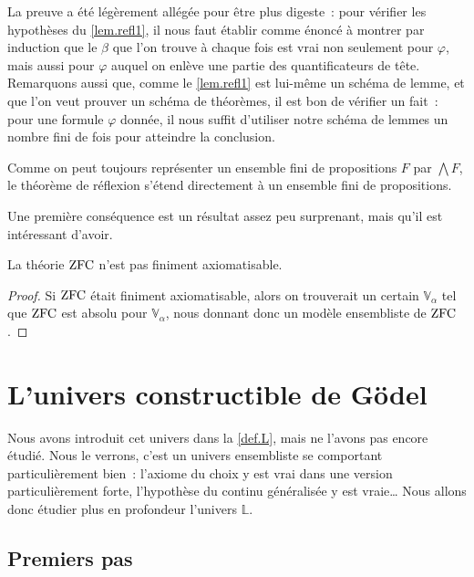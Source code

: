 \begin{remark}
  La preuve a été légèrement allégée pour être plus digeste~: pour vérifier les
  hypothèses du \cref{lem.refl1}, il nous faut établir comme énoncé à montrer
  par induction que le $\beta$ que l'on trouve à chaque fois est vrai non
  seulement pour $\varphi$, mais aussi pour $\varphi$ auquel on enlève une
  partie des quantificateurs de tête. Remarquons aussi que, comme le
  \cref{lem.refl1} est lui-même un schéma de lemme, et que l'on veut prouver
  un schéma de théorèmes, il est bon de vérifier un fait~: pour une formule
  $\varphi$ donnée, il nous suffit d'utiliser notre schéma de lemmes un nombre
  fini de fois pour atteindre la conclusion.
\end{remark}

\begin{remark}
  Comme on peut toujours représenter un ensemble fini de propositions $F$ par
  $\bigwedge F$, le théorème de réflexion s'étend directement à un ensemble fini
  de propositions.
\end{remark}

Une première conséquence est un résultat assez peu surprenant, mais qu'il est
intéressant d'avoir.

\begin{proposition}
  La théorie $\operatorname{ZFC}$ n'est pas finiment axiomatisable.
\end{proposition}

\begin{proof}
  Si $\operatorname{ZFC}$ était finiment axiomatisable, alors on trouverait un certain
  $\mathbb V_\alpha$ tel que $\operatorname{ZFC}$ est absolu pour $\mathbb V_\alpha$, nous
  donnant donc un modèle ensembliste de $\operatorname{ZFC}$.
\end{proof}

\section{L'univers constructible de Gödel}

Nous avons introduit cet univers dans la \cref{def.L}, mais ne l'avons pas
encore étudié. Nous le verrons, c'est un univers ensembliste se comportant
particulièrement bien~: l'axiome du choix y est vrai dans une version
particulièrement forte, l'hypothèse du continu généralisée y est vraie\ldots
Nous allons donc étudier plus en profondeur l'univers $\mathbb L$.

\subsection{Premiers pas}

